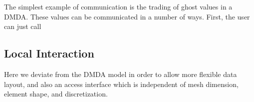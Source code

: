     The simplest example of communication is the trading of ghost values in a DMDA. These values can be communicated in a
number of ways. First, the user can just call
\begin{quote}
\end{quote}


\subsection{Local Interaction}

    Here we deviate from the DMDA model in order to allow more flexible data layout, and also an access interface which is
independent of mesh dimension, element shape, and discretization.


